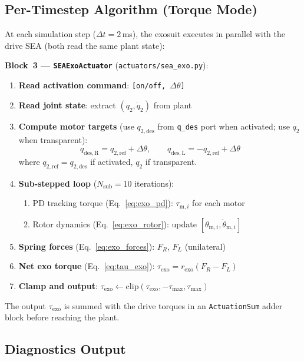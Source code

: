 \documentclass[11pt,a4paper]{article}
\begin{document}
\subsection{Per-Timestep Algorithm (Torque Mode)}
\label{sec:exo_algorithm}

At each simulation step ($\Delta t = 2$\,ms), the exosuit executes in parallel
with the drive SEA (both read the same plant state):

\medskip
\textbf{Block~3 --- \texttt{SEAExoActuator}} (\texttt{actuators/sea\_exo.py}):
\begin{enumerate}[leftmargin=2em]
    \item \textbf{Read activation command}: \texttt{[on/off, $\Delta\theta$]}
    \item \textbf{Read joint state}: extract $(q_2, \dot{q}_2)$ from plant
    \item \textbf{Compute motor targets} (use $q_{2,\mathrm{des}}$ from \texttt{q\_des} port when
          activated; use $q_2$ when transparent):
    \[
        q_{\mathrm{des,R}} = q_{2,\mathrm{ref}} + \Delta\theta, \qquad
        q_{\mathrm{des,L}} = -q_{2,\mathrm{ref}} + \Delta\theta
    \]
    where $q_{2,\mathrm{ref}} = q_{2,\mathrm{des}}$ if activated, $q_2$ if transparent.
    \item \textbf{Sub-stepped loop} ($N_{\mathrm{sub}} = 10$ iterations):
        \begin{enumerate}[label=(\alph*)]
            \item PD tracking torque (Eq.~\ref{eq:exo_pd}): $\tau_{\mathrm{m},i}$ for each motor
            \item Rotor dynamics (Eq.~\ref{eq:exo_rotor}): update $[\theta_{\mathrm{m},i}, \dot{\theta}_{\mathrm{m},i}]$
        \end{enumerate}
    \item \textbf{Spring forces} (Eq.~\ref{eq:exo_forces}): $F_R$, $F_L$ (unilateral)
    \item \textbf{Net exo torque} (Eq.~\ref{eq:tau_exo}): $\tau_{\mathrm{exo}} = r_{\mathrm{exo}}(F_R - F_L)$
    \item \textbf{Clamp and output}: $\tau_{\mathrm{exo}} \gets \mathrm{clip}(\tau_{\mathrm{exo}}, -\tau_{\max}, \tau_{\max})$
\end{enumerate}

The output $\tau_{\mathrm{exo}}$ is summed with the drive torques in an
\texttt{ActuationSum} adder block before reaching the plant.


\subsection{Diagnostics Output}
\end{document}
